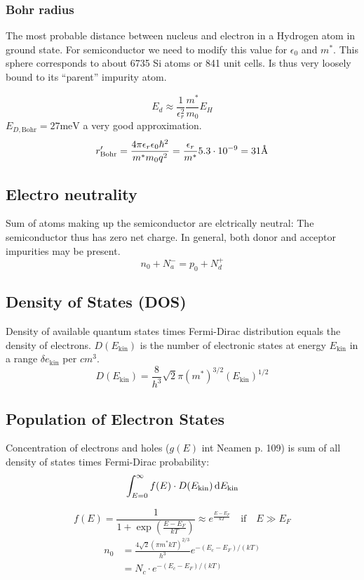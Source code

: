 \documentclass[a4paper, fontsize=8pt, landscape, DIV=1]{scrartcl}
\begin{document}
\begin{multicols*}{4}
    \subsubsection{Bohr radius}
    The most probable distance between nucleus and electron in a Hydrogen atom in ground state.
    For semiconductor we need to modify this value for $\epsilon_0$ and $m^*$.
    This sphere corresponds to about 6735  Si atoms or 841 unit cells. Is thus very loosely bound to its ``parent'' impurity atom.
  \fi

  \[E_d\approx \frac{1}{\epsilon_r^2}\frac{m^*}{m_0}E_H\]
  $E_{D,\text{Bohr}} = 27\text{meV}$ a very good approximation.
  \[r'_{\text{Bohr}}=\frac{4\pi\epsilon_r\epsilon_0\hbar^2}{m^*m_0q^2} = \frac{\epsilon_r}{m^*}5.3\cdot10^{-9}=31\textup{\AA}\]

  \subsection{Electro neutrality}
  \ifdefined\makeultracompact\else
    Sum of atoms making up the semiconductor are elctrically neutral: The semiconductor thus has zero net charge.
    In general, both donor and acceptor impurities may be present.
  \fi
  \[n_0 + N_a^- = p_0 + N_d^+\]

  \subsection{Density of States (DOS)}
  Density of available quantum states times Fermi-Dirac distribution equals the density of electrons. $D(E_\text{kin})$ is the number of electronic states at energy $E_\text{kin}$ in a range $\delta e_\text{kin}$ per $cm^3$.
  \[D(E_\text{kin}) = \frac{8}{h^3}\sqrt{2}\pi(m^*)^{3/2}(E_\text{kin})^{1/2}\]

  \subsection{Population of Electron States}

  \ifdefined\makeultracompact\else
    Concentration of electrons and holes ($g(E)$ int Neamen p. 109) is sum of all density of states times Fermi-Dirac probability:
    \[\int_{E=0}^\infty f(E) \cdot D(E_\text{kin})\,\mathrm{d} E_\text{kin}\]
  \fi

  \[f(E) = \frac{1}{1+\exp\left(\frac{E-E_F}{kT}\right)} \approx e^{\frac{E-E_F}{kT}} \quad\text{if} \quad E \gg E_F\]
  \begin{align*}
    n_0 &= \frac{4\sqrt{2}(\pi m^* kT)^{2/3}}{h^3}e^{-(E_c-E_F)/(kT)} \\
        &= N_c \cdot e^{-(E_c-E_F)/(kT)}
  \end{align*}


\end{multicols*}
\end{document}
